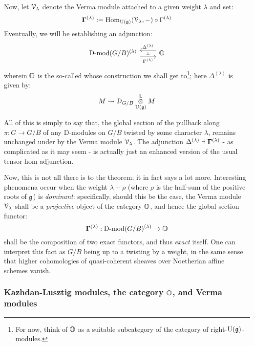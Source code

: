         Now, let $\mathcal{V}_{\lambda}$ denote the Verma module attached to a given weight $\lambda$ and set:
            $$\mathbf{\Gamma}^{(\lambda)} := \mathrm{Hom}_{\mathrm{U}(\mathfrak{g})}(\mathcal{V}_{\lambda}, -) \circ \Gamma^{(\lambda)}$$
        Eventually, we will be establishing an adjunction:
            $$
                \begin{tikzcd}
                	{\Dmod(G/B)^{(\lambda)}} & \O
                	\arrow[""{name=0, anchor=center, inner sep=0}, "{\bfGamma^{(\lambda)}}"', shift right=2, from=1-1, to=1-2]
                	\arrow[""{name=1, anchor=center, inner sep=0}, "{\Delta^{(\lambda)}}"', shift right=2, from=1-2, to=1-1]
                	\arrow["\dashv"{anchor=center, rotate=-90}, draw=none, from=1, to=0]
                \end{tikzcd}
            $$
        wherein $\mathbb{O}$ is the so-called  whose construction we shall get to\footnote{For now, think of $\mathbb{O}$ as a suitable subcategory of the category of right-$\mathrm{U}(\mathfrak{g})$-modules.}; here $\Delta^{(\lambda)}$ is given by:
            $$M \mapsto \D_{G/B} \tensor^{\L}_{\U(\g)} M$$
            
        All of this is simply to say that, the global section of the pullback along $\pi: G \to G/B$ of any D-modules on $G/B$ twisted by some character $\lambda$, remains unchanged under  by the Verma module $\mathcal{V}_{\lambda}$. The adjunction $\Delta^{(\lambda)} \dashv \mathbf{\Gamma}^{(\lambda)}$ - as complicated as it may seem - is actually just an enhanced version of the usual tensor-hom adjunction.
        
        Now, this is not all there is to the theorem; it in fact says a lot more. Interesting phenomena occur when the weight $\lambda + \rho$ (where $\rho$ is the half-sum of the positive roots of $\mathfrak{g}$) is \textit{dominant}: specifically, should this be the case, the Verma module $\mathcal{V}_{\lambda}$ shall be a \textit{projective} object of the category $\mathbb{O}$, and hence the  global section functor:
            $$\mathbf{\Gamma}^{(\lambda)}: \mathrm{D}\text{-}\mathrm{mod}(G/B)^{(\lambda)} \to \mathbb{O}$$
        shall be the composition of two exact functors, and thus \textit{exact} itself. One can interpret this fact as $G/B$ being  up to a twisting by a weight, in the same sense that higher cohomologies of quasi-coherent sheaves over Noetherian affine schemes vanish. 
                
        \subsubsection{Kazhdan-Lusztig modules, the category \texorpdfstring{$\mathbb{O}$}{}, and Verma modules}
                
